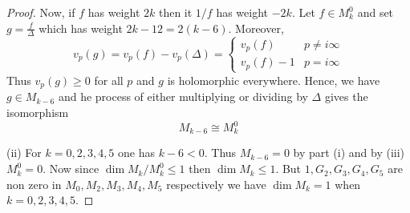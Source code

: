 \documentclass[12pt]{article}
\theoremstyle{definition}
\begin{document}
\begin{proof}
Now, if \(f\) has weight \(2k\) then it \(1/f\) has weight \(-2k\). Let \(f\in M_k^0\) and set \(g = \frac{f}{\Delta }\) which has weight \(2k-12=2(k-6)\). Moreover,
\[
    v_p(g) = v_p(f) - v_p(\Delta )= \begin{cases}
        v_p(f) & p\ne i\infty \\
        v_p(f)-1 & p = i\infty 
    \end{cases}
\]       
Thus \(v_p(g)\geq 0\) for all \(p\) and \(g\) is holomorphic everywhere. Hence, we have \(g\in M_{k-6}\) and he process of either multiplying or dividing by \(\Delta \) gives the isomorphism
\[
    M_{k-6} \cong M_{k}^0 
\]

(ii) For \(k=0,2,3,4,5\) one has \(k-6<0\). Thus \(M_{k-6}=0\) by part (i) and by (iii) \(M_k^0=0\). Now since \(\dim M_k/M_k^0 \leq 1\) then \(\dim M_k \leq 1\). But \(1,G_2,G_3,G_{4},G_5 \) are non zero in \(M_0,M_2,M_3,M_{4},M_5 \) respectively we have \(\dim M_k =1\) when \(k=0,2,3,4,5\).           
\end{proof}
\end{document}
